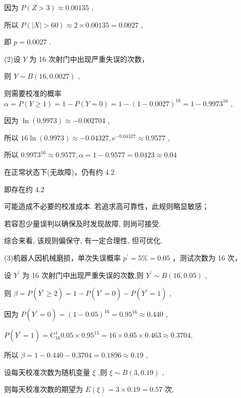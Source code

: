 \documentclass[10pt]{article}
\begin{document}
因为 \(P\left( {Z > 3}\right)  \approx  {0.00135}\) ,

所以 \(P\left( {\left| X\right|  > {60}}\right)  \approx  2 \times  {0.00135} = {0.0027}\) ,

即 \(p = {0.0027}\) .

(2)设 \(Y\) 为 16 次射门中出现严重失误的次数，

则 \(Y \sim  B\left( {{16},{0.0027}}\right)\) ,

则需要校准的概率 \(\alpha  = P\left( {Y \geq  1}\right)  = 1 - P\left( {Y = 0}\right)  = 1 - {\left( 1 - {0.0027}\right) }^{16} = 1 - {0.9973}^{16}\) ,

因为 \(\ln \left( {0.9973}\right)  \approx   - {0.002704}\) ,

所以 \({16}\ln \left( {0.9973}\right)  \approx   - {0.04327},{\mathrm{e}}^{-{0.04327}} \approx  {0.9577}\) ,

所以 \({0.9973}^{16} \approx  {0.9577},\alpha  = 1 - {0.9577} = {0.0423} \approx  {0.04}\)

在正常状态下(无故障)，仍有约 4.2%

即存在约 4.2%

可能造成不必要的校准成本. 若追求高可靠性，此规则略显敏感；

若容忍少量误判以确保及时发现故障, 则尚可接受.

综合来看, 该规则偏保守, 有一定合理性, 但可优化.

(3)机器人因机械磨损，单次失误概率 \({p}^{\prime } = 5\%  = {0.05}\) ，测试次数为 16 次，

设 \({Y}^{\prime }\) 为 16 次射门中出现严重失误的次数,则 \({Y}^{\prime } \sim  B\left( {{16},{0.05}}\right)\) ,

则 \(\beta  = P\left( {{Y}^{\prime } \geq  2}\right)  = 1 - P\left( {{Y}^{\prime } = 0}\right)  - P\left( {{Y}^{\prime } = 1}\right)\) ,

因为 \(P\left( {{Y}^{\prime } = 0}\right)  = {\left( 1 - {0.05}\right) }^{16} = {0.95}^{16} \approx  {0.440}\) ,

\(P\left( {{Y}^{\prime } = 1}\right)  = {\mathrm{C}}_{16}^{1}{0.05} \times  {0.95}^{15} = {16} \times  {0.05} \times  {0.463} \approx  {0.3704},\)

所以 \(\beta  = 1 - {0.440} - {0.3704} = {0.1896} \approx  {0.19}\) ,

设每天校准次数为随机变量 \(\xi\) ,则 \(\xi  \sim  B\left( {3,{0.19}}\right)\) ,

则每天校准次数的期望为 \(E\left( \xi \right)  = 3 \times  {0.19} = {0.57}\) 次,
\end{document}
